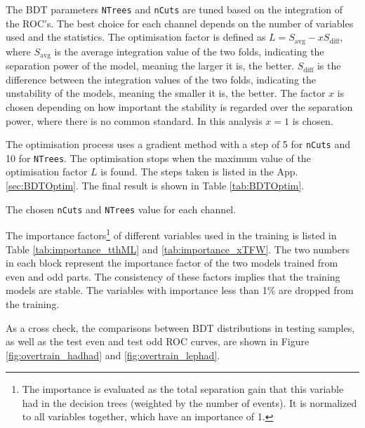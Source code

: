 The BDT parameters \texttt{NTrees} and \texttt{nCuts} are tuned based on the integration of the ROC's. The best choice for each channel depends on the number of variables used and the statistics. The optimisation factor is defined as $L=S_\mathrm{avg}-xS_\mathrm{diff}$, where $S_\mathrm{avg}$ is the average integration value of the two folds, indicating the separation power of the model, meaning the larger it is, the better. $S_\mathrm{diff}$ is the difference between the integration values of the two folds, indicating the unstability of the models, meaning the smaller it is, the better. The factor $x$ is chosen depending on how important the stability is regarded over the separation power, where there is no common standard. In this analysis $x=1$ is chosen.

The optimisation process uses a gradient method with a step of 5 for \texttt{nCuts} and 10 for \texttt{NTrees}. The optimisation stops when the maximum value of the optimisation factor $L$ is found. The steps taken is listed in the App. \ref{sec:BDTOptim}. The final result is shown in Table \ref{tab:BDTOptim}.



\begin{table}
\caption{The chosen \texttt{nCuts} and \texttt{NTrees} value for each channel.}
\label{tab:BDTOptim}


\end{table}

The importance factors\footnote{
The importance is evaluated as the total separation gain that this variable had in the decision trees (weighted by the number of events). It is normalized to all variables together, which have an importance of 1.
}
of different variables used in the training is listed in Table \ref{tab:importance_tthML} and \ref{tab:importance_xTFW}. The two numbers in each block represent the importance factor of the two models trained from even and odd parts. The consistency of these factors implies that the training models are stable. The variables with importance less than 1\% are dropped from the training.



As a cross check, the comparisons between BDT distributions in testing samples, as well as the test even and test odd ROC curves, are shown in Figure \ref{fig:overtrain_hadhad} and \ref{fig:overtrain_lephad}.





